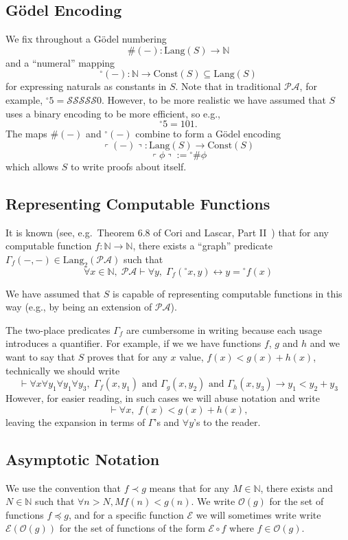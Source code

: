\documentclass[onecolumn]{miri-tech-article}
\numberwithin{equation}{section}
\theoremstyle{definition}
\newcommand{\NN}{\mathbb{N}}
\newcommand{\Ee}{\mathcal{E}}
\newcommand{\Oo}{\mathcal{O}}
\newcommand{\Ss}{\mathcal{S}}
\newcommand{\proves}[1]{\underset{#1}{\vdash}}
\newcommand{\PA}{\mathcal{P}\!\mathcal{A}}
\newcommand{\Lang}{\mathrm{Lang}}
\newcommand{\Const}{\mathrm{Const}}
\renewcommand{\implies}{\rightarrow}
\renewcommand{\to}{\rightarrow}
\renewcommand{\iff}{\leftrightarrow}
\newcommand{\qquote}[1]{\left\ulcorner #1 \right\urcorner}
\newcommand{\numeral}{{}^\circ}
\newcommand{\AND}{{\textrm{ and }}}
\renewcommand{\-}{^{-1}}
\begin{document}
\subsection{G\"{o}del Encoding}
We fix throughout a G\"{o}del numbering
 $$\#(-) : \Lang(S) \to \NN$$
and a ``numeral'' mapping
$$\numeral(-) : \NN \to \Const(S)\subseteq \Lang(S)$$
for expressing naturals as constants in $S$.  Note that in traditional $\PA$, for example, $\numeral 5 = \Ss\Ss\Ss\Ss\Ss0$.  However, to be more realistic we have assumed that $S$ uses a binary encoding to be more efficient, so e.g.,
$$\numeral 5 = 101.$$
The maps $\#(-)$ and $\numeral(-)$ combine to form a G\"{o}del encoding
$$\qquote{(-)} : \Lang(S)\to\Const(S)$$
$$\qquote{\phi}:=\numeral \# \phi$$
which allows $S$ to write proofs about itself.

\subsection{Representing Computable Functions}\label{sec:rep}
It is known (see, e.g.\ Theorem 6.8 of Cori and Lascar, Part II~\cite{Cori:2001}) that for any computable function $f:\NN\to\NN$, there exists a ``graph'' predicate $\Gamma_f(-,-)\in\Lang_2(\PA)$ such that
%
$$\forall x\in\NN, \; \PA \proves{} \forall y, \; \Gamma_f(\numeral x,y) \iff y = \numeral f(x)$$

\noindent We have assumed that $S$ is capable of representing computable functions in this way (e.g., by being an extension of $\PA$).

The two-place predicates $\Gamma_f$ are cumbersome in writing because each usage introduces a quantifier.  For example, if we we have functions $f$, $g$ and $h$ and we want to say that $S$ proves that for any $x$ value, $f(x) < g(x) + h(x)$, technically we should write
%
$$\proves{} \forall x \forall y_1 \forall y_1 \forall y_3,\; \Gamma_f(x,y_1) \AND \Gamma_g(x,y_2)\AND \Gamma_h(x,y_3) \implies y_1 < y_2 + y_3$$
%
However, for easier reading, in such cases we will abuse notation and write
$$\proves{} \forall x, \; f(x) < g(x) + h(x),$$
leaving the expansion in terms of $\Gamma$'s and $\forall y$'s to the reader.

\subsection{Asymptotic Notation}
We use the convention that $f \prec g$ means that for any $M\in \NN$, there exists and $N\in\NN$ such that $\forall n>N, Mf(n) < g(n)$.  We write $\Oo(g)$ for the set of functions $f\preceq g$, and for a specific function $\Ee$ we will sometimes write write $\Ee(\Oo(g))$ for the set of functions of the form $\Ee \circ f$ where $f\in \Oo(g)$.
\end{document}
